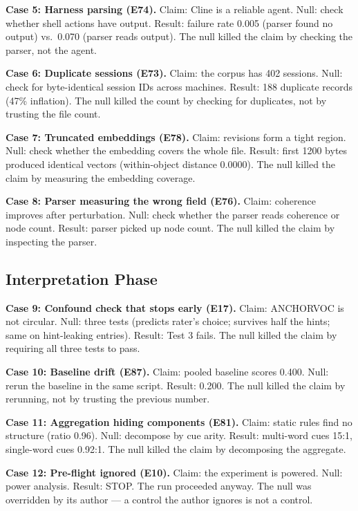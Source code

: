 \documentclass[11pt]{article}
\begin{document}
\textbf{Case 5: Harness parsing (E74).} Claim: Cline is a reliable
agent. Null: check whether shell actions have output. Result: failure
rate 0.005 (parser found no output) vs.\ 0.070 (parser reads output).
The null killed the claim by checking the parser, not the agent.

\textbf{Case 6: Duplicate sessions (E73).} Claim: the corpus has 402
sessions. Null: check for byte-identical session IDs across machines.
Result: 188 duplicate records (47\% inflation). The null killed the
count by checking for duplicates, not by trusting the file count.

\textbf{Case 7: Truncated embeddings (E78).} Claim: revisions form a
tight region. Null: check whether the embedding covers the whole file.
Result: first 1200 bytes produced identical vectors (within-object
distance 0.0000). The null killed the claim by measuring the embedding
coverage.

\textbf{Case 8: Parser measuring the wrong field (E76).} Claim: coherence
improves after perturbation. Null: check whether the parser reads
coherence or node count. Result: parser picked up node count. The null
killed the claim by inspecting the parser.

\subsection{Interpretation Phase}

\textbf{Case 9: Confound check that stops early (E17).} Claim: ANCHORVOC
is not circular. Null: three tests (predicts rater's choice; survives
half the hints; same on hint-leaking entries). Result: Test 3 fails.
The null killed the claim by requiring all three tests to pass.

\textbf{Case 10: Baseline drift (E87).} Claim: pooled baseline scores
0.400. Null: rerun the baseline in the same script. Result: 0.200. The
null killed the claim by rerunning, not by trusting the previous number.

\textbf{Case 11: Aggregation hiding components (E81).} Claim: static
rules find no structure (ratio 0.96). Null: decompose by cue arity.
Result: multi-word cues 15:1, single-word cues 0.92:1. The null killed
the claim by decomposing the aggregate.

\textbf{Case 12: Pre-flight ignored (E10).} Claim: the experiment is
powered. Null: power analysis. Result: STOP. The run proceeded anyway.
The null was overridden by its author --- a control the author ignores is
not a control.
\end{document}
